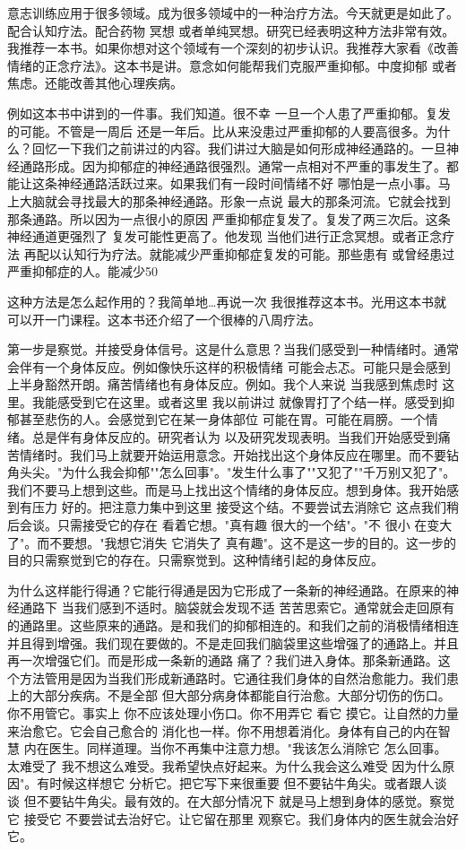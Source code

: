 意志训练应用于很多领域。成为很多领域中的一种治疗方法。今天就更是如此了。配合认知疗法。配合药物 冥想 或者单纯冥想。研究已经表明这种方法非常有效。我推荐一本书。如果你想对这个领域有一个深刻的初步认识。我推荐大家看《改善情绪的正念疗法》。这本书是讲。意念如何能帮我们克服严重抑郁。中度抑郁 或者焦虑。还能改善其他心理疾病。 

例如这本书中讲到的一件事。我们知道。很不幸 一旦一个人患了严重抑郁。复发的可能。不管是一周后 还是一年后。比从来没患过严重抑郁的人要高很多。为什么？回忆一下我们之前讲过的内容。我们讲过大脑是如何形成神经通路的。一旦神经通路形成。因为抑郁症的神经通路很强烈。通常一点相对不严重的事发生了。都能让这条神经通路活跃过来。如果我们有一段时间情绪不好 哪怕是一点小事。马上大脑就会寻找最大的那条神经通路。形象一点说 最大的那条河流。它就会找到那条通路。所以因为一点很小的原因 严重抑郁症复发了。复发了两三次后。这条神经通道更强烈了 复发可能性更高了。他发现 当他们进行正念冥想。或者正念疗法 再配以认知行为疗法。就能减少严重抑郁症复发的可能。那些患有 或曾经患过严重抑郁症的人。能减少50%

这种方法是怎么起作用的？我简单地…再说一次 我很推荐这本书。光用这本书就可以开一门课程。这本书还介绍了一个很棒的八周疗法。 

第一步是察觉。并接受身体信号。这是什么意思？当我们感受到一种情绪时。通常会伴有一个身体反应。例如像快乐这样的积极情绪 可能会忐忑。可能只是会感到上半身豁然开朗。痛苦情绪也有身体反应。例如。我个人来说 当我感到焦虑时 这里。我能感受到它在这里。或者这里 我以前讲过 就像胃打了个结一样。感受到抑郁甚至悲伤的人。会感觉到它在某一身体部位 可能在胃。可能在肩膀。一个情绪。总是伴有身体反应的。研究者认为 以及研究发现表明。当我们开始感受到痛苦情绪时。我们马上就要开始运用意念。开始找出这个身体反应在哪里。而不要钻角头尖。"为什么我会抑郁""怎么回事"。"发生什么事了""又犯了""千万别又犯了"。我们不要马上想到这些。而是马上找出这个情绪的身体反应。想到身体。我开始感到有压力 好的。把注意力集中到这里 接受这个结。不要尝试去消除它 这点我们稍后会谈。只需接受它的存在 看着它想。"真有趣 很大的一个结"。"不 很小 在变大了"。而不要想。"我想它消失 它消失了 真有趣"。这不是这一步的目的。这一步的目的只需察觉到它的存在。只需察觉到。这种情绪引起的身体反应。 

为什么这样能行得通？它能行得通是因为它形成了一条新的神经通路。在原来的神经通路下 当我们感到不适时。脑袋就会发现不适 苦苦思索它。通常就会走回原有的通路里。这些原来的通路。是和我们的抑郁相连的。和我们之前的消极情绪相连 并且得到增强。我们现在要做的。不是走回我们脑袋里这些增强了的通路上。并且再一次增强它们。而是形成一条新的通路 痛了？我们进入身体。那条新通路。这个方法管用是因为当我们形成新通路时。它通往我们身体的自然治愈能力。我们患上的大部分疾病。不是全部 但大部分病身体都能自行治愈。大部分切伤的伤口。你不用管它。事实上 你不应该处理小伤口。你不用弄它 看它 摸它。让自然的力量来治愈它。它会自己愈合的 消化也一样。你不用想着消化。身体有自己的内在智慧 内在医生。同样道理。当你不再集中注意力想。"我该怎么消除它 怎么回事。太难受了 我不想这么难受。我希望快点好起来。为什么我会这么难受 因为什么原因"。有时候这样想它 分析它。把它写下来很重要 但不要钻牛角尖。或者跟人谈谈 但不要钻牛角尖。最有效的。在大部分情况下 就是马上想到身体的感觉。察觉它 接受它 不要尝试去治好它。让它留在那里 观察它。我们身体内的医生就会治好它。 

